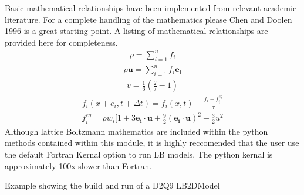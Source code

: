 \documentclass[letterpaper,10pt,english]{sphinxmanual}
\begin{document}
Basic mathematical relationships have been implemented from relevant academic literature. For
a complete handling of the mathematics please Chen and Doolen 1996 is a great starting point. A listing
of mathematical relationships are provided here for completeness.
\begin{equation*}
\begin{split}\rho = \sum_{i=1}^{n} f_{i}\end{split}
\end{equation*}\begin{equation*}
\begin{split}\rho \pmb{u} = \sum_{i=1}^{n} f_{i} \pmb{e_{i}}\end{split}
\end{equation*}\begin{equation*}
\begin{split}v = \frac{1}{6} (\frac{2}{\tau}- 1)\end{split}
\end{equation*}\begin{equation*}
\begin{split}f_{i}(x + e_{i}, t + \Delta t) = f_{i}(x, t) - \frac{f_{i} - f_{i}^{eq}}{\tau}\end{split}
\end{equation*}\begin{equation*}
\begin{split}f_{i}^{eq} = \rho w_{i}[1 + 3\pmb{e_{i} \cdot u} +
\frac{9}{2}(\pmb{e_{i} \cdot u})^{2} - \frac{3}{2} u^{2}\end{split}
\end{equation*}
Although lattice Boltzmann mathematics are included within the python
methods contained within this module, it is highly reccomended that the user
use the default Fortran Kernal option to run LB models. The python kernal is approximately
100x slower than Fortran.

Example showing the build and run of a D2Q9 LB2DModel
\end{document}
